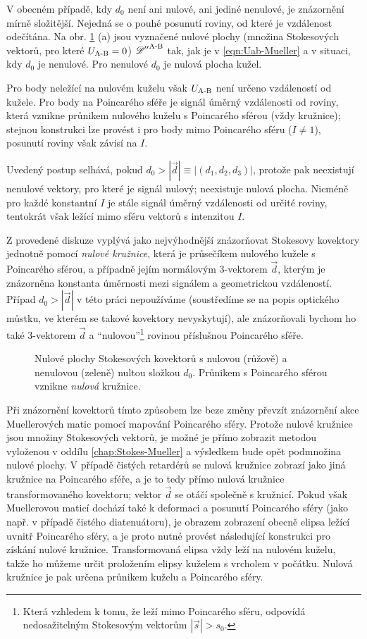 V obecném případě, kdy $d_0$ není ani nulové, ani jediné nenulové, je znázornění mírně složitější.
Nejedná se o pouhé posunutí roviny, od které je vzdálenost odečítána.
Na obr. \ref{fig:mustek-znazorneni-kovektoru} (a) jsou vyznačené nulové plochy (množina Stokesových vektorů, pro které $U_\textrm{A-B}=0$) ${\mathscr{D}''}^\textrm{A-B}$ tak, jak je v \eqref{eqn:Uab-Mueller} a v situaci, kdy $d_0$ je nenulové.
Pro nenulové $d_0$ je nulová plocha kužel.

Pro body neležící na nulovém kuželu však $U_\textrm{A-B}$ není určeno vzdáleností od kužele.
Pro body na Poincarého sféře je signál úměrný vzdálenosti od roviny, která vznikne průnikem nulového kuželu s Poincarého sférou (vždy kružnice); stejnou konstrukci lze provést i pro body mimo Poincarého sféru ($I\neq1$), posunutí roviny však závisí na $I$.

Uvedený postup selhává, pokud $d_0>|\vec{d}|\equiv|(d_1, d_2, d_3)|$, protože pak ne\-existují nenulové vektory, pro které je signál nulový; neexistuje nulová plocha.
Nicméně pro každé konstantní $I$ je stále signál úměrný vzdálenosti od určité roviny, tentokrát však ležící mimo sféru vektorů s intenzitou $I$.

Z provedené diskuze vyplývá jako nejvýhodnější znázorňovat Stokesovy kovektory jednotně pomocí \emph{nulové kružnice}, která je průsečíkem nulového kužele s Poincarého sférou, a případně jejím normálovým 3-vektorem $\vec{d}$, kterým je znázorněna konstanta úměrnosti mezi signálem a geometrickou vzdáleností.
Případ $d_0>|\vec{d}|$ v této práci nepoužíváme (soustředíme se na popis optického můstku, ve kterém se takové kovektory nevyskytují), ale znázorňovali bychom ho také 3-vektorem $\vec{d}$ a ``nulovou''\footnote{Která vzhledem k tomu, že leží mimo Poincarého sféru, odpovídá nedosažitelným Stokesovým vektorům $|\vec{s}|>s_0$.} rovinou příslušnou Poincarého sféře.

\begin{figure}[htbp]
    \centering
    
    \caption{Nulové plochy Stokesových kovektorů s nulovou (růžově) a nenulovou (zeleně) nultou složkou $d_0$. Průnikem s Poincarého sférou vznikne \emph{nulová} kružnice.}
    \label{fig:mustek-znazorneni-kovektoru}
\end{figure}

Při znázornění kovektorů tímto způsobem lze beze změny převzít znázornění akce Muellerových matic pomocí mapování Poincarého sféry.
Protože nulové kružnice jsou množiny Stokesových vektorů, je možné je přímo zobrazit metodou vyloženou v oddílu \ref{chap:Stokes-Mueller} a výsledkem bude opět podmnožina nulové plochy.
V případě čistých retardérů se nulová kružnice zobrazí jako jiná kružnice na Poincarého sféře, a je to tedy přímo nulová kružnice transformovaného kovektoru; vektor $\vec{d}$ se otáčí společně s kružnicí.
Pokud však Muellerovou maticí dochází také k deformaci a posunutí Poincarého sféry (jako např. v případě čistého diatenuátoru), je obrazem zobrazení obecně elipsa ležící uvnitř Poincarého sféry, a je proto nutné provést následující konstrukci pro získání nulové kružnice.
Transformovaná elipsa vždy leží na nulovém kuželu, takže ho můžeme určit proložením elipsy kuželem s vrcholem v počátku.
Nulová kružnice je pak určena průnikem kuželu a Poincarého sféry.
